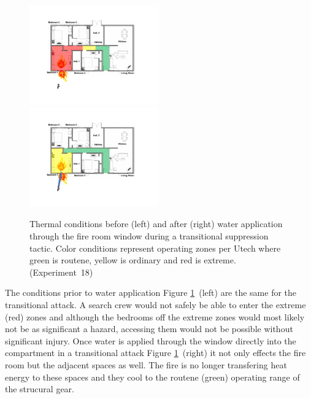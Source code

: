 \documentclass[12pt,oneside]{book}
\begin{document}
\begin{figure}[H]
\centering
\includegraphics[width=0.495\textwidth]{../0_Images/Tactical_Considerations/Similtanious_Search/Transitional_Pre}
\includegraphics[width=0.495\textwidth]{../0_Images/Tactical_Considerations/Similtanious_Search/Transitional_Post}
\caption[Thermal Conditions - Similatnious Search - Transitional]{Thermal conditions before (left) and after (right) water application through the fire room window during a transitional suppression tactic. Color conditions represent operating zones per Utech \cite{Utech_Firefighter_Clothing} where green is routene, yellow is ordinary and red is extreme. (Experiment~18)}
\label{fig:similatnious_search_tc_trans}
\end{figure}

The conditions prior to water application Figure \ref{fig:similatnious_search_tc_trans}~(left) are the same for the transitional attack. A search crew would not safely be able to enter the extreme (red) zones and although the bedrooms off the extreme zones would most likely not be as significant a hazard, accessing them would not be possible without significant injury. Once water is applied through the window directly into the compartment in a transitional attack Figure \ref{fig:similatnious_search_tc_trans}~(right) it not only effects the fire room but the adjacent spaces as well. The fire is no longer transfering heat energy to these spaces and they cool to the routene (green) operating range of the strucural gear. 
\end{document}
